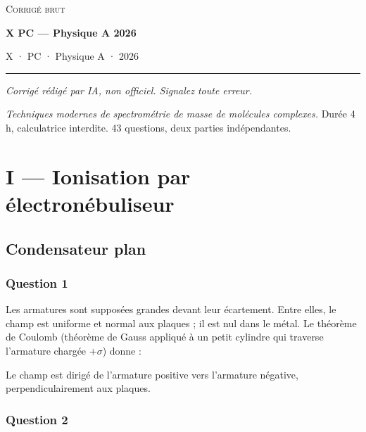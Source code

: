 \documentclass[11pt,a4paper]{article}
\newcommand{\equationajustee}[1]{%
  \sbox{\boiteequation}{$\displaystyle #1$}%
  \ifdim\wd\boiteequation>\linewidth
    \[\resizebox{\linewidth}{!}{\usebox{\boiteequation}}\]%
  \else
    \[#1\]%
  \fi}
\begin{document}
\thispagestyle{plain}
\begin{center}
  {\small\scshape Corrigé brut}\par\smallskip
  {\LARGE\bfseries X PC — Physique A 2026\par}\medskip
  {\large X · PC · Physique A · 2026\par}
\end{center}
\vspace{2pt}\hrule\vspace{8pt}

\emph{Corrigé rédigé par IA, non officiel. Signalez toute erreur.}

\emph{Techniques modernes de spectrométrie de masse de molécules complexes.} Durée 4 h, calculatrice interdite. 43 questions, deux parties indépendantes.

\hypertarget{i-ionisation-par-uxe9lectronuxe9buliseur}{%
\section{I --- Ionisation par électronébuliseur}\label{i-ionisation-par-uxe9lectronuxe9buliseur}}

\hypertarget{condensateur-plan}{%
\subsection{Condensateur plan}\label{condensateur-plan}}

\hypertarget{question-1}{%
\subsubsection{Question 1}\label{question-1}}

Les armatures sont supposées grandes devant leur écartement. Entre elles, le champ est uniforme et normal aux plaques ; il est nul dans le métal. Le théorème de Coulomb (théorème de Gauss appliqué à un petit cylindre qui traverse l'armature chargée \(+\sigma\)) donne :

\equationajustee{\boxed{E=\frac{\sigma}{\varepsilon_0}}}

Le champ est dirigé de l'armature positive vers l'armature négative, perpendiculairement aux plaques.

\hypertarget{question-2}{%
\subsubsection{Question 2}\label{question-2}}

\equationajustee{\boxed{u_e=\frac12\,\varepsilon_0E^2}}
\end{document}
